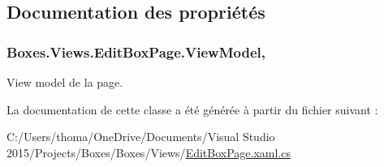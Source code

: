 \subsection{Documentation des propriétés}
\subsubsection[{\texorpdfstring{View\+Model}{ViewModel}}]{ Boxes.\+Views.\+Edit\+Box\+Page.\+View\+Model\hspace{0.3cm}{\ttfamily [get]}, {\ttfamily [private]}}\hypertarget{class_boxes_1_1_views_1_1_edit_box_page_a42247471e3696be281fdbd8c11c21253}{}\label{class_boxes_1_1_views_1_1_edit_box_page_a42247471e3696be281fdbd8c11c21253}


View model de la page. 



La documentation de cette classe a été générée à partir du fichier suivant \+:\begin{DoxyCompactItemize}
\item 
C\+:/\+Users/thoma/\+One\+Drive/\+Documents/\+Visual Studio 2015/\+Projects/\+Boxes/\+Boxes/\+Views/\hyperlink{_edit_box_page_8xaml_8cs}{Edit\+Box\+Page.\+xaml.\+cs}\end{DoxyCompactItemize}
